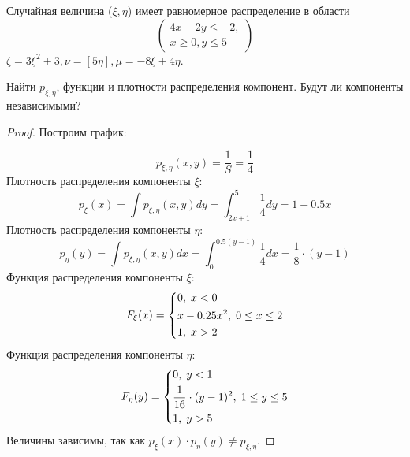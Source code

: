 
\renewcommand*{\proofname}{Решение}

Случайная величина ($\xi, \eta$) имеет равномерное распределение в области
\[ 
	\begin{pmatrix}
		4x - 2y \leq -2,\\
		x \geq 0, y \leq 5
	\end{pmatrix}
\]
$\zeta = 3\xi^2 + 3, \nu = [5\eta], \mu = -8\xi + 4\eta$.

\begin{problem}
	Найти $p_{\xi, \eta}$, функции и плотности распределения компонент. Будут ли компоненты независимыми?
\end{problem}

\begin{proof}
	Построим график:
	\begin{center}
	\end{center}
	\[
		p_{\xi, \eta}(x, y) = \frac{1}{S} = \frac{1}{4}
	\]
	Плотность распределения компоненты $\xi$:
	\[
		p_\xi(x) = \int p_{\xi, \eta}(x, y) dy = \int_{2x+1}^{5} \frac{1}{4}dy = 1 - 0.5x
	\]
	Плотность распределения компоненты $\eta$:
	\[
		p_\eta(y) = \int p_{\xi, \eta}(x, y) dx = \int_{0}^{0.5(y-1)} \frac{1}{4}dx = \frac{1}{8} \cdot (y - 1)
	\]
	Функция распределения компоненты $\xi$:
	\[
		F_\xi(x) =
		\begin{dcases}
			0, \; x < 0\\
			x - 0.25x^2, \; 0 \le x \le 2\\
			1, \; x > 2
		\end{dcases}
	\]
	Функция распределения компоненты $\eta$:
	\[
		F_\eta(y) =
		\begin{dcases}
			0, \; y < 1\\
			\frac{1}{16} \cdot (y - 1)^2, \; 1 \le y \le 5\\
			1, \; y > 5
		\end{dcases}
	\]
	Величины зависимы, так как $p_\xi(x) \cdot p_\eta(y) \neq p_{\xi, \eta}$.
\end{proof}

